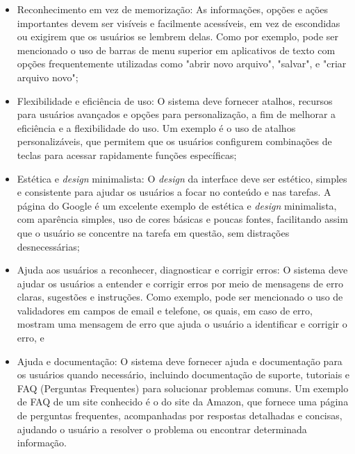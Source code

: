 \begin{description}
\begin{itemize}
            \item Reconhecimento em vez de memorização: As informações, opções e ações importantes devem ser visíveis e 
            facilmente acessíveis, em vez de escondidas ou exigirem que os usuários se lembrem delas. Como por exemplo, pode ser mencionado 
            o uso de barras de menu superior em aplicativos de texto com opções frequentemente utilizadas como "abrir novo arquivo", "salvar", e "criar 
            arquivo novo";

            \item Flexibilidade e eficiência de uso: O sistema deve fornecer atalhos, recursos para usuários avançados e 
            opções para personalização, a fim de melhorar a eficiência e a flexibilidade do uso. Um exemplo é o uso de atalhos personalizáveis, que 
            permitem que os usuários configurem combinações de teclas para acessar rapidamente funções específicas;

            \item Estética e \textit{design} minimalista: O \textit{design} da interface deve ser estético, simples e consistente para ajudar
             os usuários a focar no conteúdo e nas tarefas. A página do Google é um excelente exemplo de estética e \textit{design} minimalista, com aparência simples, 
             uso de cores básicas e poucas fontes, facilitando assim que o usuário se concentre na tarefa em questão, sem distrações desnecessárias; 
            
            \item Ajuda aos usuários a reconhecer, diagnosticar e corrigir erros: O sistema deve ajudar os usuários a entender e corrigir erros por meio de mensagens 
            de erro claras, sugestões e instruções. Como exemplo, pode ser mencionado o uso de validadores em campos de email e telefone, os quais, em caso de erro, 
            mostram uma mensagem de erro que ajuda o usuário a identificar e corrigir o erro, e

            \item Ajuda e documentação: O sistema deve fornecer ajuda e documentação para os usuários quando necessário, incluindo 
            documentação de suporte, tutoriais e FAQ (Perguntas Frequentes) para solucionar problemas comuns. Um exemplo de FAQ de um site conhecido é o do site da 
            Amazon, que fornece uma página de perguntas frequentes, acompanhadas por respostas detalhadas e concisas, ajudando o usuário a resolver o problema ou encontrar 
            determinada informação.
        \end{itemize}
\end{description}

